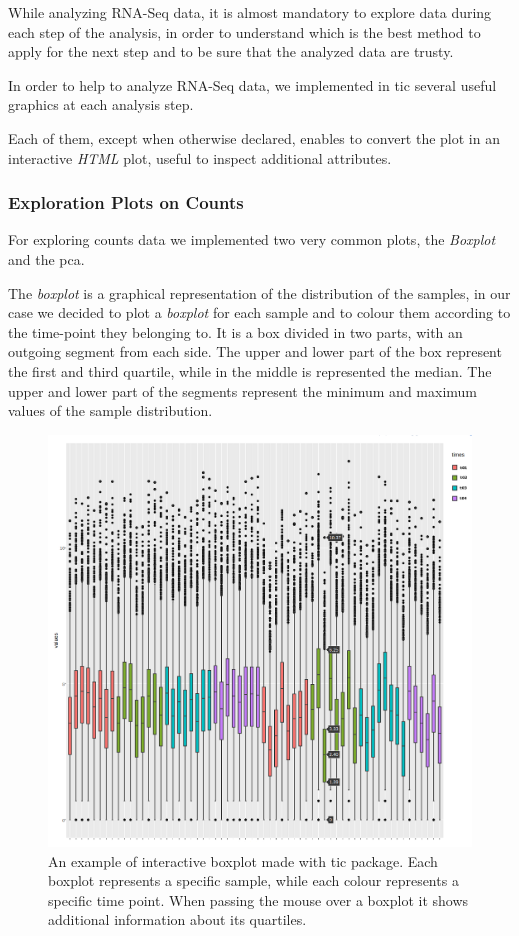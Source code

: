 While analyzing RNA-Seq data, it is almost mandatory to explore data during each step of the analysis, in order to understand which is the best method to apply for the next step and to be sure that the analyzed data are trusty.

In order to help to analyze RNA-Seq data, we implemented in \gls{tic} several useful graphics at each analysis step.

Each of them, except when otherwise declared, enables to convert the plot in an interactive \textit{HTML} plot, useful to inspect additional attributes.

\subsubsection{Exploration Plots on Counts}
For exploring counts data we implemented two very common plots, the \textit{Boxplot} and the \gls{pca}.

The \textit{boxplot} is a graphical representation of the distribution of the samples, in our case we decided to plot a \textit{boxplot} for each sample and to colour them according to the time-point they belonging to.
It is a box divided in two parts, with an outgoing segment from each side. 
The upper and lower part of the box represent the first and third quartile, while in the middle is represented the median.
The upper and lower part of the segments represent the minimum and maximum values of the sample distribution.


\begin{figure}[H]
\includegraphics[width=\textwidth,height=\textheight,keepaspectratio]{img/ticorser/boxplot_example.png}
\caption[ticorser boxplot]{An example of interactive boxplot made with \gls{tic} package. Each boxplot represents a specific sample, while each colour represents a specific time point. When passing the mouse over a boxplot it shows additional information about its quartiles.}
\label{fig:ticorserboxplot}
\centering
\end{figure}
 

